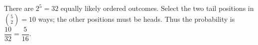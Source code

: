There are $2^5=32$ equally likely ordered outcomes. Select the two tail positions in $\binom52=10$ ways; the other positions must be heads. Thus the probability is $\boxed{\dfrac{10}{32}=\dfrac{5}{16}}$.
